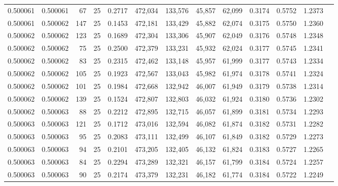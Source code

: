 \begin{tabular}{rrrrrrrrrrrrr}
0.500061 & 0.500061 &    67 &  25 &                                     0.2717 & 472,034 & 133,576 &  45,857 &  62,099 & 0.3174 & 0.5752 & 1.2373 \\
0.500061 & 0.500062 &   147 &  25 &                                     0.1453 & 472,181 & 133,429 &  45,882 &  62,074 & 0.3175 & 0.5750 & 1.2360 \\
0.500062 & 0.500062 &   123 &  25 &                                     0.1689 & 472,304 & 133,306 &  45,907 &  62,049 & 0.3176 & 0.5748 & 1.2348 \\
0.500062 & 0.500062 &    75 &  25 &                                     0.2500 & 472,379 & 133,231 &  45,932 &  62,024 & 0.3177 & 0.5745 & 1.2341 \\
0.500062 & 0.500062 &    83 &  25 &                                     0.2315 & 472,462 & 133,148 &  45,957 &  61,999 & 0.3177 & 0.5743 & 1.2334 \\
0.500062 & 0.500062 &   105 &  25 &                                     0.1923 & 472,567 & 133,043 &  45,982 &  61,974 & 0.3178 & 0.5741 & 1.2324 \\
0.500062 & 0.500062 &   101 &  25 &                                     0.1984 & 472,668 & 132,942 &  46,007 &  61,949 & 0.3179 & 0.5738 & 1.2314 \\
0.500062 & 0.500062 &   139 &  25 &                                     0.1524 & 472,807 & 132,803 &  46,032 &  61,924 & 0.3180 & 0.5736 & 1.2302 \\
0.500062 & 0.500063 &    88 &  25 &                                     0.2212 & 472,895 & 132,715 &  46,057 &  61,899 & 0.3181 & 0.5734 & 1.2293 \\
0.500063 & 0.500063 &   121 &  25 &                                     0.1712 & 473,016 & 132,594 &  46,082 &  61,874 & 0.3182 & 0.5731 & 1.2282 \\
0.500063 & 0.500063 &    95 &  25 &                                     0.2083 & 473,111 & 132,499 &  46,107 &  61,849 & 0.3182 & 0.5729 & 1.2273 \\
0.500063 & 0.500063 &    94 &  25 &                                     0.2101 & 473,205 & 132,405 &  46,132 &  61,824 & 0.3183 & 0.5727 & 1.2265 \\
0.500063 & 0.500063 &    84 &  25 &                                     0.2294 & 473,289 & 132,321 &  46,157 &  61,799 & 0.3184 & 0.5724 & 1.2257 \\
0.500063 & 0.500063 &    90 &  25 &                                     0.2174 & 473,379 & 132,231 &  46,182 &  61,774 & 0.3184 & 0.5722 & 1.2249 \\

\end{tabular}
